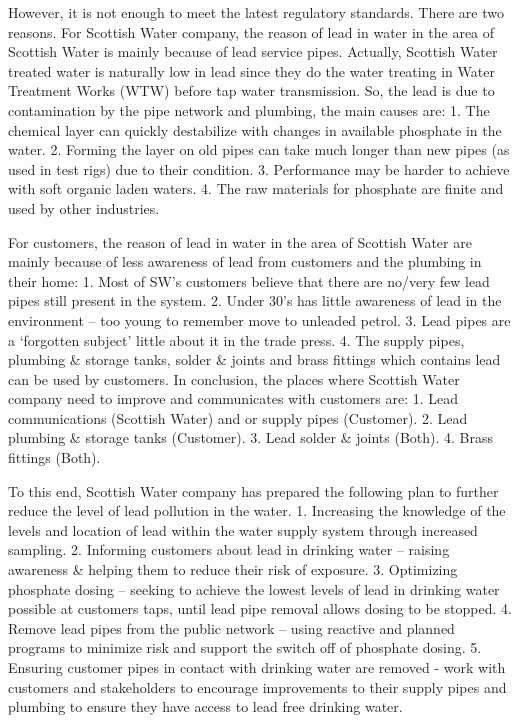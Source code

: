 \documentclass[11pt,twoside]{article}
\numberwithin{Theorem}{section}
\numberwithin{Definition}{section}
\numberwithin{Lemma}{section}
\numberwithin{Algorithm}{section}
\numberwithin{equation}{section}
\begin{document}
However, it is not enough to meet the latest regulatory standards. There are two reasons.
For Scottish Water company, the reason of lead in water in the area of Scottish Water is mainly because of lead service pipes. Actually, Scottish Water treated water is naturally low in lead since they do the water treating in Water Treatment Works (WTW) before tap water transmission. So, the lead is due to contamination by the pipe network and plumbing, the main causes are: 1. The chemical layer can quickly destabilize with changes in available phosphate in the water. 2. Forming the layer on old pipes can take much longer than new pipes (as used in test rigs) due to their condition. 3. Performance may be harder to achieve with soft organic laden waters. 4. The raw materials for phosphate are finite and used by other industries.

For customers, the reason of lead in water in the area of Scottish Water are mainly because of less awareness of lead from customers and the plumbing in their home: 1. Most of SW's customers believe that there are no/very few lead pipes still present in the system. 2. Under 30's has little awareness of lead in the environment – too young to remember move to unleaded petrol. 3. Lead pipes are a `forgotten subject' little about it in the trade press. 4. The supply pipes, plumbing \& storage tanks, solder \& joints and brass fittings which contains lead can be used by customers.
In conclusion, the places where Scottish Water company need to improve and communicates with customers are: 1. Lead communications (Scottish Water) and or supply pipes (Customer). 2. Lead plumbing \& storage tanks (Customer). 3. Lead solder \& joints (Both). 4. Brass fittings (Both).

To this end, Scottish Water company has prepared the following plan to further reduce the level of lead pollution in the water. 1. Increasing the knowledge of the levels and location of lead within the water supply system through increased sampling. 2. Informing customers about lead in drinking water – raising awareness \& helping them to reduce their risk of exposure. 3. Optimizing phosphate dosing – seeking to achieve the lowest levels of lead in drinking water possible at customers taps, until lead pipe removal allows dosing to be stopped. 4. Remove lead pipes from the public network – using reactive and planned programs to minimize risk and support the switch off of phosphate dosing. 5. Ensuring customer pipes in contact with drinking water are removed - work with customers and stakeholders to encourage improvements to their supply pipes and plumbing to ensure they have access to lead free drinking water.
\end{document}
